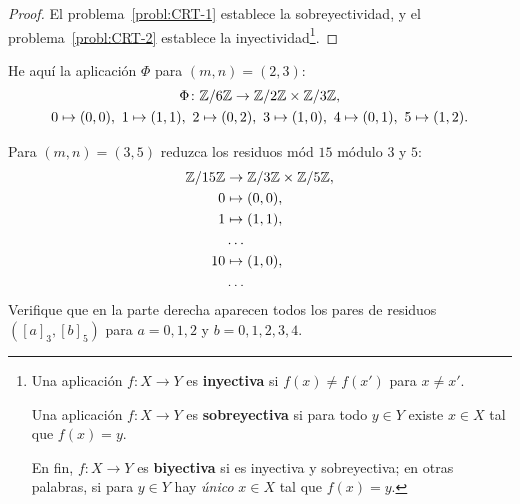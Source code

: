 \documentclass{article}
\begin{document}
\begin{proof}
  El problema~\ref{probl:CRT-1} establece la sobreyectividad,
  y el problema~\ref{probl:CRT-2} establece la inyectividad\footnote{Una
    aplicación $f\colon X\to Y$ es \textbf{inyectiva} si $f (x) \ne f (x')$ para
    $x \ne x'$.

    Una aplicación $f\colon X\to Y$ es \textbf{sobreyectiva} si para todo
    $y \in Y$ existe $x \in X$ tal que $f (x) = y$.

    En fin, $f\colon X\to Y$ es \textbf{biyectiva} si es inyectiva y
    sobreyectiva; en otras palabras, si para $y \in Y$ hay \emph{único}
    $x \in X$ tal que $f (x) = y$.}.
\end{proof}

\begin{ejemplo}
  He aquí la aplicación $\Phi$ para $(m,n) = (2,3)$:
  \begin{gather*}
    \Phi\colon \mathbb{Z}/6\mathbb{Z} \to \mathbb{Z}/2\mathbb{Z} \times \mathbb{Z}/3\mathbb{Z},\\
    0 \mapsto (0,0), ~
    1 \mapsto (1,1), ~
    2 \mapsto (0,2), ~
    3 \mapsto (1,0), ~
    4 \mapsto (0,1), ~
    5 \mapsto (1,2).
  \end{gather*}
\end{ejemplo}

\begin{problema}
  Para $(m,n) = (3,5)$ reduzca los residuos mód $15$ módulo $3$ y $5$:
  \begin{align*}
    \mathbb{Z}/15\mathbb{Z} & \to \mathbb{Z}/3\mathbb{Z} \times \mathbb{Z}/5\mathbb{Z}, \\
    0 & \mapsto (0,0), \\
    1 & \mapsto (1,1), \\
              & \ldots \\
    10 & \mapsto (1,0), \\
      & \ldots
  \end{align*}
  Verifique que en la parte derecha aparecen todos los pares de residuos
  $([a]_3, [b]_5)$ para $a = 0,1,2$ y $b = 0,1,2,3,4$.
\end{problema}
\end{document}
